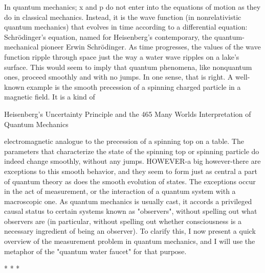         In quantum mechanics; x and p do not enter into the equations of motion as
they do in classical mechanics. Instead, it is the wave function (in nonrelativistic
quantum mechanics) that evolves in time according to a differential equation:
Schrödinger’s equation, named for Heisenberg's contemporary, the quantum-
mechanical pioneer Erwin Schrödinger. As time progresses, the values of the wave
function ripple through space just the way a water wave ripples on a lake's surface.
This would seem to imply that quantum phenomena, like nonquantum ones, proceed
smoothly and with no jumps. In one sense, that is right. A well-known example is the
smooth precession of a spinning charged particle in a magnetic field. It is a kind of




Heisenberg's Uncertainty Principle and the                                            465
Many Worlds Interpretation of Quantum Mechanics

electromagnetic analogue to the precession of a spinning top on a table. The
parameters that characterize the state of the spinning top or spinning particle do
indeed change smoothly, without any jumps.
        HOWEVER-a big however-there are exceptions to this smooth behavior, and
they seem to form just as central a part of quantum theory as does the smooth
evolution of states. The exceptions occur in the act of measurement, or the interaction
of a quantum system with a macroscopic one. As quantum mechanics is usually cast,
it accords a privileged causal status to certain systems known as "observers", without
spelling out what observers are (in particular, without spelling out whether
consciousness is a necessary ingredient of being an observer). To clarify this, I now
present a quick overview of the measurement problem in quantum mechanics, and I
will use the metaphor of the "quantum water faucet" for that purpose.

                                        *   *   *

